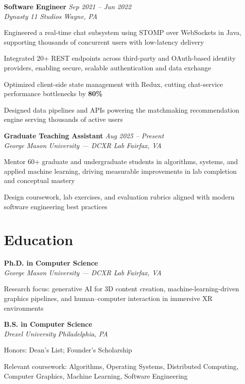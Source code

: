 \documentclass[letterpaper,10pt]{article}
\newcommand{\role}[4]{%
  \textbf{#1} \hfill \textit{#3}\\[-1pt]
  \textit{#2} \hfill \textit{#4}\par\vspace{2pt}
}
\newcommand{\education}[4]{%
  \textbf{#1} \hfill \textit{#3}\\[-1pt]
  \textit{#2} \hfill \textit{#4}\par\vspace{2pt}
}
\begin{document}
\role{Software Engineer}{Dynasty 11 Studios}{Sep 2021 -- Jun 2022}{Wayne, PA}
\begin{tightitemize}
  \item Engineered a real-time chat subsystem using STOMP over WebSockets in Java, supporting thousands of concurrent users with low-latency delivery
  \item Integrated 20+ REST endpoints across third-party and OAuth-based identity providers, enabling secure, scalable authentication and data exchange
  \item Optimized client-side state management with Redux, cutting chat-service performance bottlenecks by \textbf{80\%}
  \item Designed data pipelines and APIs powering the matchmaking recommendation engine serving thousands of active users
\end{tightitemize}

\role{Graduate Teaching Assistant}{George Mason University --- DCXR Lab}{Aug 2025 -- Present}{Fairfax, VA}
\begin{tightitemize}
  \item Mentor 60+ graduate and undergraduate students in algorithms, systems, and applied machine learning, driving measurable improvements in lab completion and conceptual mastery
  \item Design coursework, lab exercises, and evaluation rubrics aligned with modern software engineering best practices
\end{tightitemize}

\section*{Education}
\education{Ph.D. in Computer Science}{George Mason University --- DCXR Lab}{}{Fairfax, VA}
\begin{tightitemize}
    \item Research focus: generative AI for 3D content creation, machine-learning-driven graphics pipelines, and human--computer interaction in immersive XR environments
\end{tightitemize}

\education{B.S. in Computer Science}{Drexel University}{}{Philadelphia, PA}
\begin{tightitemize}
    \item Honors: Dean's List; Founder's Scholarship
    \item Relevant coursework: Algorithms, Operating Systems, Distributed Computing, Computer Graphics, Machine Learning, Software Engineering
\end{tightitemize}
\end{document}
